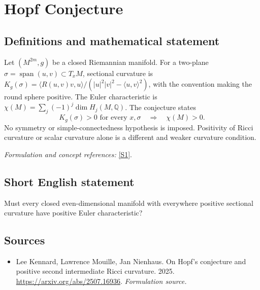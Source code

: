 \documentclass[11pt]{article}
\begin{document}
\section*{\texorpdfstring{Hopf Conjecture}{Hopf Conjecture}}\label{30001953}
\subsection{Definitions and mathematical statement}
Let $(M^{2m},g)$ be a closed Riemannian manifold. For a two-plane $\sigma=\operatorname{span}(u,v)\subset T_xM$, sectional curvature is
$K_g(\sigma)=\langle R(u,v)v,u\rangle/(|u|^2|v|^2-\langle u,v\rangle^2)$, with the convention making the round sphere positive. The Euler characteristic is
$\chi(M)=\sum_j(-1)^j\dim H_j(M,{\mathbb{Q}})$. The conjecture states
\[
 K_g(\sigma)>0\text{ for every }x,\sigma
 \quad\Longrightarrow\quad\chi(M)>0.
\]
No symmetry or simple-connectedness hypothesis is imposed. Positivity of Ricci curvature or scalar curvature alone is a different and weaker curvature condition.
\par\smallskip\textit{Formulation and concept references:} \href{https://arxiv.org/abs/2507.16936}{[S1]}.

\subsection{Short English statement}
Must every closed even-dimensional manifold with everywhere positive sectional curvature have positive Euler characteristic?
\subsection{Sources}
\begin{itemize}
\item[S1]Lee Kennard, Lawrence Mouille, Jan Nienhaus. On Hopf's conjecture and positive second intermediate Ricci curvature. 2025.
\url{https://arxiv.org/abs/2507.16936}.
\textit{Formulation source.}
\end{itemize}
\end{document}
